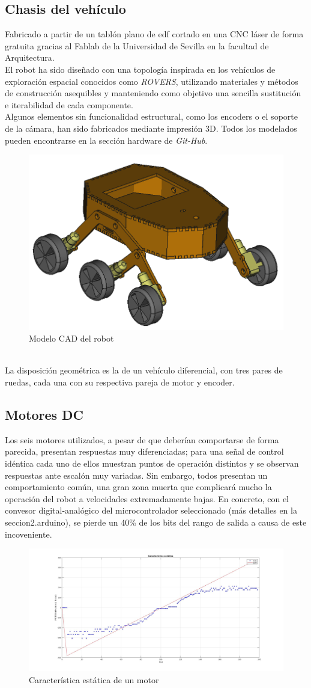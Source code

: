 \subsection{Chasis del vehículo}
Fabricado a partir de un tablón plano de edf cortado en una CNC láser de forma gratuita gracias al Fablab de la Universidad de Sevilla en la facultad de Arquitectura. \\
El robot ha sido diseñado con una topología inspirada en los vehículos de exploración espacial conocidos como \textit{ROVERS}, utilizando materiales y métodos de construcción asequibles y
manteniendo como objetivo una sencilla sustitución e iterabilidad de cada componente. \\
Algunos elementos sin funcionalidad estructural, como los encoders o el soporte de la cámara, han sido fabricados mediante impresión 3D. Todos los modelados pueden encontrarse en la sección
hardware de \textit{Git-Hub}.
\begin{figure}[h!]
	\centering
	\includegraphics[width=.5\textwidth]{images/hw/wheele_stl}
	\caption{Modelo CAD del robot}
\end{figure}
\\
La disposición geométrica es la de un vehículo diferencial, con tres pares de ruedas, cada una con su respectiva pareja de motor y encoder.\\

\subsection{Motores DC}
 Los seis motores utilizados, a pesar de que deberían comportarse de forma parecida, presentan respuestas muy diferenciadas; para una señal de control idéntica cada uno de ellos muestran puntos de operación distintos y se observan respuestas ante escalón muy variadas. Sin embargo, 
 todos presentan un comportamiento común, una gran zona muerta que complicará mucho la operación del robot a velocidades extremadamente bajas. En concreto, con el convesor digital-analógico del microcontrolador seleccionado (más detalles en la seccion2.arduino), se pierde un 40\% de los bits del rango de salida a causa de este incoveniente.  
 \begin{figure}[h!]
 	\centering
 	\includegraphics[width=.6\textwidth]{images/hw/estatica}
 	\caption{Característica estática de un motor}
 \end{figure}
 \newpage
